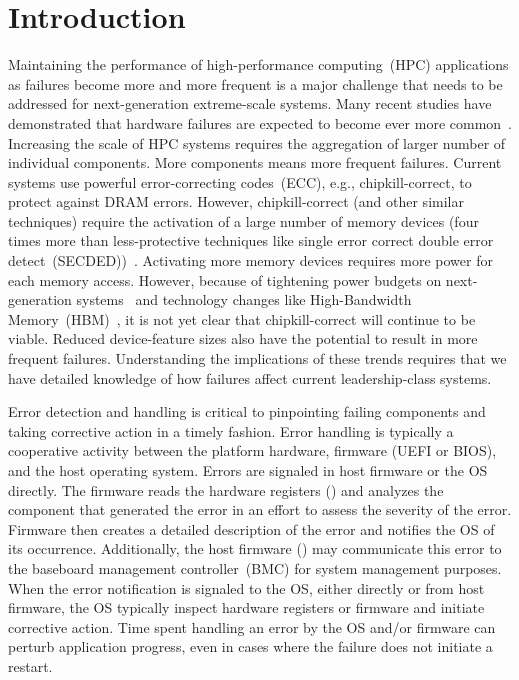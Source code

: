 
\section{Introduction}
\label{sec:intro}



Maintaining the performance of high-performance computing~(HPC) applications as
failures become more and more frequent is a major challenge that needs to be
addressed for next-generation extreme-scale systems.  Many recent studies have
demonstrated that hardware failures are expected to become ever more
common~\cite{Bergman08exascalecomputing}.  Increasing the scale of HPC systems
requires the aggregation of larger number of individual components.  More
components means more frequent failures.  Current systems use powerful
error-correcting codes~(ECC), e.g., chipkill-correct, to protect against DRAM
errors.  However, chipkill-correct (and other similar techniques) require the
activation of a large number of memory devices (four times more than
less-protective techniques like single error correct double error
detect~(SECDED))~\cite{Jian13}.  Activating more memory devices requires more
power for each memory access.  However, because of tightening power budgets on
next-generation systems~\cite{Bergman08exascalecomputing} and technology
changes like High-Bandwidth Memory~(HBM)~\cite{HBM}, it is not yet clear that
chipkill-correct will continue to be viable.  Reduced device-feature sizes also
have the potential to result in more frequent failures.  Understanding the
implications of these trends requires that we have detailed knowledge of how
failures affect current leadership-class systems.

Error detection and handling is critical to pinpointing failing components and
taking corrective action in a timely fashion.  Error handling is typically
a cooperative activity between the platform hardware, firmware (UEFI or BIOS),
and the host operating system.  Errors are signaled in host firmware
or the OS directly. The firmware reads the hardware registers () 
and analyzes the component that generated the error in an effort to assess the severity of
the error.  Firmware then creates a detailed description of the error and
notifies the OS of its occurrence. Additionally, the host firmware () may communicate
this error to the baseboard management controller~(BMC) for system management purposes.
When the error notification is signaled to the OS, either directly or from host
firmware, the OS typically inspect hardware registers or firmware and initiate
corrective action.  Time spent handling an error by the OS and/or firmware can perturb
application progress, even in cases where the failure does not initiate a
restart.

